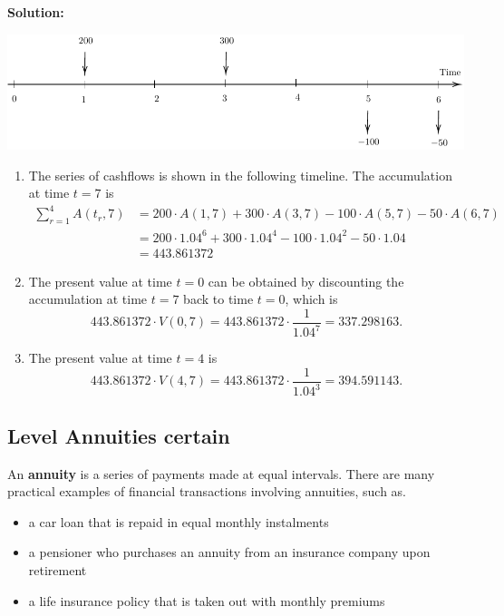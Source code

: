 \documentclass[landscape, 20pt]{extreport}
\theoremstyle{definition}
\theoremstyle{definition}
\theoremstyle{definition}
\theoremstyle{definition}
\theoremstyle{remark}
\begin{document}
\textbf{Solution:}

\begin{center}\includegraphics{tikz-ex8-1} \end{center}

\begin{enumerate}
\def\labelenumi{\arabic{enumi}.}
\item
  The series of cashflows is shown in the following timeline. The
  accumulation at time \(t = 7\) is \[\begin{aligned}
      \sum_{r=1}^4 A(t_r,7) &= 200 \cdot A(1,7) +  300 \cdot A(3,7) -  100 \cdot A(5,7) -  50 \cdot A(6,7) \\
      &= 200 \cdot 1.04^6 + 300 \cdot 1.04^4 - 100 \cdot 1.04^2 - 50 \cdot 1.04 \\
      & = 443.861372\end{aligned}\]
\item
  The present value at time \(t = 0\) can be obtained by discounting the
  accumulation at time \(t = 7\) back to time \(t = 0\), which is
  \[443.861372  \cdot V(0,7) = 443.861372  \cdot \frac{1}{1.04^7} = 337.298163.\]
\item
  The present value at time \(t = 4\) is
  \[443.861372  \cdot V(4,7) = 443.861372  \cdot \frac{1}{1.04^3} = 394.591143.\]
\end{enumerate}

\hypertarget{level-annuities-certain}{%
\subsection{Level Annuities certain}\label{level-annuities-certain}}

An \textbf{annuity} is a series of payments made at equal intervals. There are many practical examples of financial transactions involving annuities, such as.

\begin{itemize}
\item
  a car loan that is repaid in equal monthly instalments
\item
  a pensioner who purchases an annuity from an insurance company upon retirement
\item
  a life insurance policy that is taken out with monthly premiums
\end{itemize}
\end{document}
